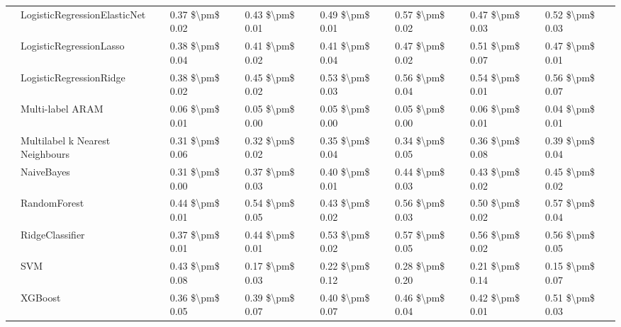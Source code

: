 \begin{tabular}{llllllll}
   & LogisticRegressionElasticNet &  0.37 \$\textbackslash pm\$ 0.02 &           0.43 \$\textbackslash pm\$ 0.01 &       0.49 \$\textbackslash pm\$ 0.01 &        0.57 \$\textbackslash pm\$ 0.02 &                         0.47 \$\textbackslash pm\$ 0.03 &      0.52 \$\textbackslash pm\$ 0.03 \\
   & LogisticRegressionLasso &  0.38 \$\textbackslash pm\$ 0.04 &           0.41 \$\textbackslash pm\$ 0.02 &       0.41 \$\textbackslash pm\$ 0.04 &        0.47 \$\textbackslash pm\$ 0.02 &                         0.51 \$\textbackslash pm\$ 0.07 &      0.47 \$\textbackslash pm\$ 0.01 \\
   & LogisticRegressionRidge &  0.38 \$\textbackslash pm\$ 0.02 &           0.45 \$\textbackslash pm\$ 0.02 &       0.53 \$\textbackslash pm\$ 0.03 &        0.56 \$\textbackslash pm\$ 0.04 &                         0.54 \$\textbackslash pm\$ 0.01 &      0.56 \$\textbackslash pm\$ 0.07 \\
   & Multi-label ARAM &  0.06 \$\textbackslash pm\$ 0.01 &           0.05 \$\textbackslash pm\$ 0.00 &       0.05 \$\textbackslash pm\$ 0.00 &        0.05 \$\textbackslash pm\$ 0.00 &                         0.06 \$\textbackslash pm\$ 0.01 &      0.04 \$\textbackslash pm\$ 0.01 \\
   & Multilabel k Nearest Neighbours &  0.31 \$\textbackslash pm\$ 0.06 &           0.32 \$\textbackslash pm\$ 0.02 &       0.35 \$\textbackslash pm\$ 0.04 &        0.34 \$\textbackslash pm\$ 0.05 &                         0.36 \$\textbackslash pm\$ 0.08 &      0.39 \$\textbackslash pm\$ 0.04 \\
   & NaiveBayes &  0.31 \$\textbackslash pm\$ 0.00 &           0.37 \$\textbackslash pm\$ 0.03 &       0.40 \$\textbackslash pm\$ 0.01 &        0.44 \$\textbackslash pm\$ 0.03 &                         0.43 \$\textbackslash pm\$ 0.02 &      0.45 \$\textbackslash pm\$ 0.02 \\
   & RandomForest &  0.44 \$\textbackslash pm\$ 0.01 &           0.54 \$\textbackslash pm\$ 0.05 &       0.43 \$\textbackslash pm\$ 0.02 &        0.56 \$\textbackslash pm\$ 0.03 &                         0.50 \$\textbackslash pm\$ 0.02 &      0.57 \$\textbackslash pm\$ 0.04 \\
   & RidgeClassifier &  0.37 \$\textbackslash pm\$ 0.01 &           0.44 \$\textbackslash pm\$ 0.01 &       0.53 \$\textbackslash pm\$ 0.02 &        0.57 \$\textbackslash pm\$ 0.05 &                         0.56 \$\textbackslash pm\$ 0.02 &      0.56 \$\textbackslash pm\$ 0.05 \\
   & SVM &  0.43 \$\textbackslash pm\$ 0.08 &           0.17 \$\textbackslash pm\$ 0.03 &       0.22 \$\textbackslash pm\$ 0.12 &        0.28 \$\textbackslash pm\$ 0.20 &                         0.21 \$\textbackslash pm\$ 0.14 &      0.15 \$\textbackslash pm\$ 0.07 \\
   & XGBoost &  0.36 \$\textbackslash pm\$ 0.05 &           0.39 \$\textbackslash pm\$ 0.07 &       0.40 \$\textbackslash pm\$ 0.07 &        0.46 \$\textbackslash pm\$ 0.04 &                         0.42 \$\textbackslash pm\$ 0.01 &      0.51 \$\textbackslash pm\$ 0.03 \\
\bottomrule
\end{tabular}
